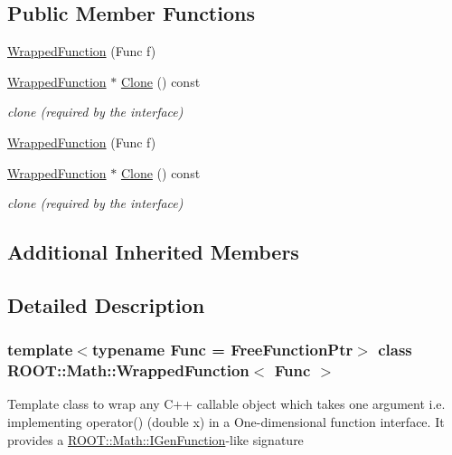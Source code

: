 \subsection*{Public Member Functions}
\begin{DoxyCompactItemize}
\item 
\mbox{\hyperlink{classROOT_1_1Math_1_1WrappedFunction_aa5dcde11a189a6fccb4262d341f31146}{Wrapped\+Function}} (Func f)
\item 
\mbox{\hyperlink{classROOT_1_1Math_1_1WrappedFunction}{Wrapped\+Function}} $\ast$ \mbox{\hyperlink{classROOT_1_1Math_1_1WrappedFunction_a4ec89f0c717b0fc228ebe7d71e14b1ee}{Clone}} () const
\begin{DoxyCompactList}\small\item\em clone (required by the interface) \end{DoxyCompactList}\item 
\mbox{\hyperlink{classROOT_1_1Math_1_1WrappedFunction_aa5dcde11a189a6fccb4262d341f31146}{Wrapped\+Function}} (Func f)
\item 
\mbox{\hyperlink{classROOT_1_1Math_1_1WrappedFunction}{Wrapped\+Function}} $\ast$ \mbox{\hyperlink{classROOT_1_1Math_1_1WrappedFunction_a4ec89f0c717b0fc228ebe7d71e14b1ee}{Clone}} () const
\begin{DoxyCompactList}\small\item\em clone (required by the interface) \end{DoxyCompactList}\end{DoxyCompactItemize}
\subsection*{Additional Inherited Members}


\subsection{Detailed Description}
\subsubsection*{template$<$typename Func = Free\+Function\+Ptr$>$\newline
class R\+O\+O\+T\+::\+Math\+::\+Wrapped\+Function$<$ Func $>$}

Template class to wrap any C++ callable object which takes one argument i.\+e. implementing operator() (double x) in a One-\/dimensional function interface. It provides a \mbox{\hyperlink{namespaceROOT_1_1Math_afe6400b4439b79d54c41fb9f5c5af171}{R\+O\+O\+T\+::\+Math\+::\+I\+Gen\+Function}}-\/like signature


